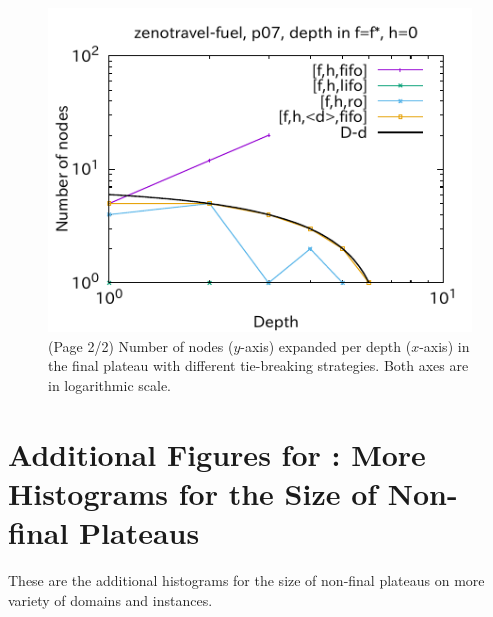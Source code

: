 \begin{figure}[htbp]
\includegraphics[width=0.49\linewidth]{img/output-lmcut/zenotravel-fuel/p07-0.pdf}
 \caption{(Page 2/2) Number of nodes ($y$-axis) expanded per depth ($x$-axis) in
 the final plateau with different tie-breaking strategies. Both axes are in logarithmic scale.
 }
 \label{fig:depth-histogram3}
\end{figure}

\clearpage
\section{Additional Figures for : More Histograms for the Size of Non-final Plateaus}

These are the additional histograms for the size of non-final plateaus on
more variety of domains and instances.

